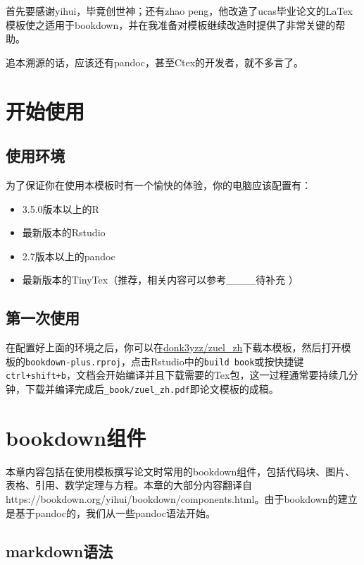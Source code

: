 \documentclass[singlesided]{Style/ucasthesis}%
\newcommand{\tightlist}{%
  \setlength{\itemsep}{0pt}\setlength{\parskip}{0pt}}
\begin{document}
首先要感谢yihui，毕竟创世神；还有zhao peng，他改造了ucas毕业论文的LaTex模板使之适用于bookdown，并在我准备对模板继续改造时提供了非常关键的帮助。

追本溯源的话，应该还有pandoc，甚至Ctex的开发者，就不多言了。

\hypertarget{start}{%
\chapter{开始使用}\label{start}}

\hypertarget{section}{%
\section{使用环境}\label{section}}

为了保证你在使用本模板时有一个愉快的体验，你的电脑应该配置有：

\begin{itemize}
\tightlist
\item
  3.5.0版本以上的R
\item
  最新版本的Rstudio
\item
  2.7版本以上的pandoc
\item
  最新版本的TinyTex（推荐，相关内容可以参考\_\_\_\_待补充 ）
\end{itemize}

\hypertarget{first-use}{%
\section{第一次使用}\label{first-use}}

在配置好上面的环境之后，你可以在\href{https://github.com/donk3yzz/zuel_zh}{donk3yzz/zuel\_zh}下载本模板，然后打开模板的\texttt{bookdown-plus.rproj}，点击Rstudio中的\texttt{build\ book}或按快捷键\texttt{ctrl+shift+b}，文档会开始编译并且下载需要的Tex包，这一过程通常要持续几分钟，下载并编译完成后\texttt{\_book/zuel\_zh.pdf}即论文模板的成稿。

\hypertarget{bookdown}{%
\chapter{bookdown组件}\label{bookdown}}

本章内容包括在使用模板撰写论文时常用的bookdown组件，包括代码块、图片、表格、引用、数学定理与方程。本章的大部分内容翻译自https://bookdown.org/yihui/bookdown/components.html。由于bookdown的建立是基于pandoc的，我们从一些pandoc语法开始。

\hypertarget{markdown}{%
\section{markdown语法}\label{markdown}}
\end{document}
